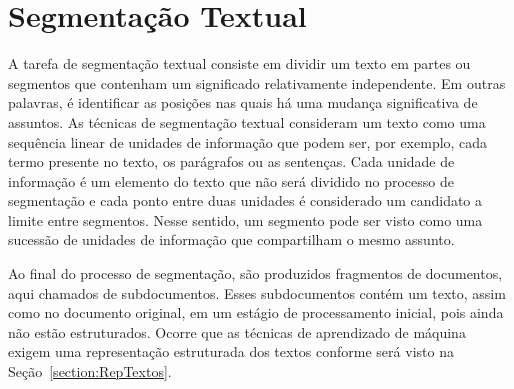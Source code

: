 \section{Segmentação Textual}


A tarefa de segmentação textual consiste em dividir um texto em partes ou segmentos que contenham um significado relativamente independente. Em outras palavras, é identificar as posições nas quais há uma mudança significativa de assuntos. As técnicas de segmentação textual consideram um texto como uma sequência linear de unidades de informação que podem ser, por exemplo, cada termo presente no texto, os parágrafos ou as sentenças. Cada unidade de informação é um elemento do texto que não será dividido no processo de segmentação e cada ponto entre duas unidades é considerado um candidato a limite entre segmentos. Nesse sentido, um segmento pode ser visto como uma sucessão de unidades de informação que compartilham o mesmo assunto.










Ao final do processo de segmentação, são produzidos fragmentos de documentos, aqui chamados de subdocumentos. Esses subdocumentos contém um texto, assim como no documento original, em um estágio de processamento inicial, pois ainda não estão estruturados. Ocorre que as técnicas de aprendizado de máquina exigem uma representação estruturada dos textos conforme será visto na Seção~\ref{section:RepTextos}.





